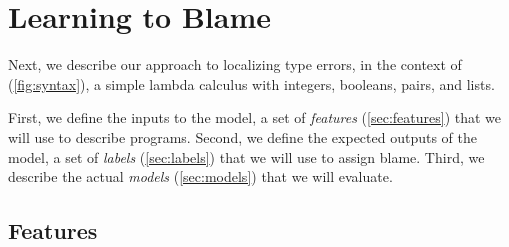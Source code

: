 \section{Learning to Blame}
\label{sec:learning}
Next, we describe our approach to localizing type errors, in the context
of \lang (\autoref{fig:syntax}), a simple lambda calculus with integers,
booleans, pairs, and lists.
%

%
First, we define the inputs to the model, a set of \emph{features}
(\autoref{sec:features}) that we will use to describe programs.
%
Second, we define the expected outputs of the model, a set of
\emph{labels} (\autoref{sec:labels}) that we will use to assign blame.
%
Third, we describe the actual \emph{models} (\autoref{sec:models}) that we
will evaluate.

\subsection{Features}
\label{sec:features}

